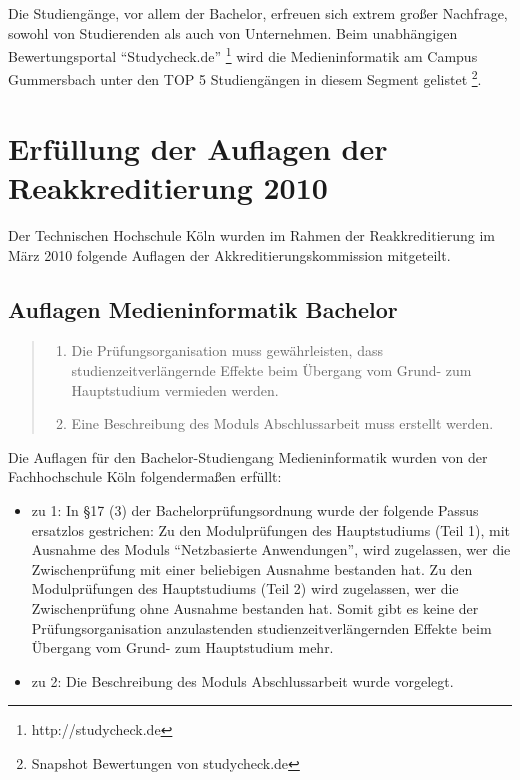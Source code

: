 Die Studiengänge, vor allem der Bachelor, erfreuen sich extrem großer
Nachfrage, sowohl von Studierenden als auch von Unternehmen. Beim
unabhängigen Bewertungsportal ``Studycheck.de'' \footnote{http://studycheck.de}
wird die Medieninformatik am Campus Gummersbach unter den TOP 5
Studiengängen in diesem Segment gelistet \footnote{Snapshot Bewertungen
  von studycheck.de}.

\section{Erfüllung der Auflagen der Reakkreditierung
2010}\label{erfuxfcllung-der-auflagen-der-reakkreditierung-2010}

Der Technischen Hochschule Köln wurden im Rahmen der Reakkreditierung im
März 2010 folgende Auflagen der Akkreditierungskommission mitgeteilt.

\subsection{Auflagen Medieninformatik
Bachelor}\label{auflagen-medieninformatik-bachelor}

\begin{quote}
\begin{enumerate}
\def\labelenumi{\arabic{enumi}.}
\tightlist
\item
  Die Prüfungsorganisation muss gewährleisten, dass
  studienzeitverlängernde Effekte beim Übergang vom Grund- zum
  Hauptstudium vermieden werden.
\item
  Eine Beschreibung des Moduls Abschlussarbeit muss erstellt werden.
\end{enumerate}
\end{quote}

Die Auflagen für den Bachelor-Studiengang Medieninformatik wurden von
der Fachhochschule Köln folgendermaßen erfüllt:

\begin{itemize}
\tightlist
\item
  zu 1: In §17 (3) der Bachelorprüfungsordnung wurde der folgende Passus
  ersatzlos gestrichen: Zu den Modulprüfungen des Hauptstudiums (Teil
  1), mit Ausnahme des Moduls ``Netzbasierte Anwendungen'', wird
  zugelassen, wer die Zwischenprüfung mit einer beliebigen Ausnahme
  bestanden hat. Zu den Modulprüfungen des Hauptstudiums (Teil 2) wird
  zugelassen, wer die Zwischenprüfung ohne Ausnahme bestanden hat. Somit
  gibt es keine der Prüfungsorganisation anzulastenden
  studienzeitverlängernden Effekte beim Übergang vom Grund- zum
  Hauptstudium mehr.
\item
  zu 2: Die Beschreibung des Moduls Abschlussarbeit wurde vorgelegt.
\end{itemize}

